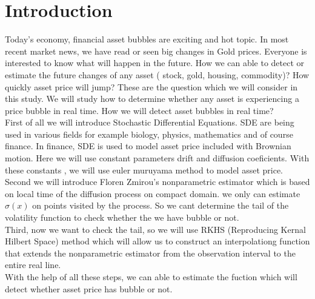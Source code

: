 \section{Introduction}
Today's economy, financial asset bubbles are exciting and hot topic. 
In most recent market news, we have read or seen big changes in Gold prices. 
Everyone is interested to know what will happen in the future. 
How we can able to detect or estimate the future changes of any asset ( stock, gold, housing, commodity)? 
How quickly asset price will jump? These are the question which we will consider in this study. 
We will study how to determine whether any asset is experiencing a price bubble in real time. 
How we will detect asset bubbles in real time?\\

 First of all we will introduce Stochastic Differential Equations. 
 SDE are being used in various fields for example biology, physics, mathematics and of course finance. 
 In finance, SDE is used to model asset price included with Brownian motion. 
 Here we will use constant parameters drift and diffusion coeficients. 
 With these constants , we will use euler muruyama method to model asset price. \\
 
 Second we will introduce Floren Zmirou's nonparametric estimator which is based on local time of the diffusion process on compact domain. 
 we only can estimate $\sigma(x)$ on points visited by the process. 
 So we cant determine the tail of the volatility function to check whether the we have bubble or not. \\
 
 Third, now we want to check the tail, so we will use RKHS (Reproducing Kernal Hilbert Space)  method which will allow us to construct an interpolationg function that extends the nonparametric estimator from the observation interval to the entire real line.\\
 
 With the help of all these steps, we can able to estimate the fuction which will detect whether asset price has bubble or not.\\
 
 


